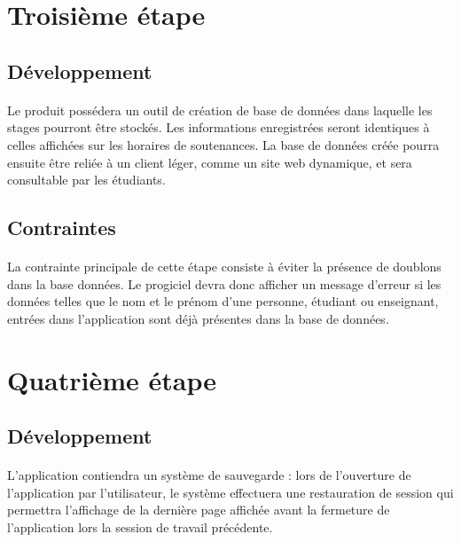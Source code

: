 \documentclass[a4paper,10pt]{report}
\begin{document}
      

    \section{Troisième étape}
      \subsection{Développement}
	\paragraph{}
	Le produit possédera un outil de création de base de données dans laquelle les stages pourront être stockés. 
	Les informations enregistrées seront identiques à celles affichées sur les horaires de soutenances. 
	La base de données créée pourra ensuite être reliée à un client léger, comme un site web dynamique, et sera consultable par les étudiants.

      \subsection{Contraintes}
	\paragraph{}
	  La contrainte principale de cette étape consiste à éviter la présence de doublons dans la base données. 
	  Le progiciel devra donc afficher un message d'erreur si les données telles que le nom et le prénom d'une personne, étudiant ou enseignant, entrées dans l'application sont déjà présentes dans la base de données. 
      
    \section{Quatrième étape}
      \subsection{Développement}
	\paragraph{}
	  L’application contiendra un système de sauvegarde : lors de l’ouverture de l’application par l’utilisateur, le système effectuera une restauration de session qui permettra l’affichage de la dernière page affichée avant la fermeture de l’application lors la session de travail précédente.
\end{document}

